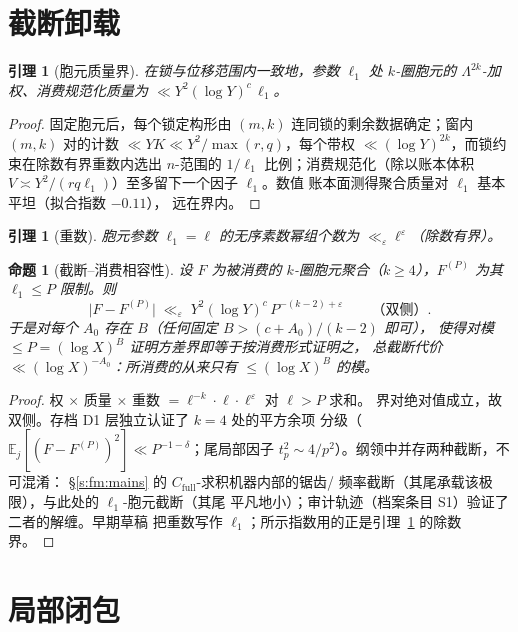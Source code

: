 \documentclass[11pt]{article}
\numberwithin{equation}{section}
\newtheorem{lemma}[theorem]{引理}
\newtheorem{proposition}[theorem]{命题}
\theoremstyle{definition}
\theoremstyle{remark}
\newcommand{\LL}{\Lambda}
\begin{document}
\section{截断卸载}\label{s:trunc}

\begin{lemma}[胞元质量界]\label{l:mass}
在锁与位移范围内一致地，参数 $\ell_1$ 处 $k$-圈胞元的
$\LL^{2k}$-加权、消费规范化质量为
$\ll Y^{2}(\log Y)^{c}\,\ell_1$。
\end{lemma}

\begin{proof}
固定胞元后，每个锁定构形由 $(m,k)$ 连同锁的剩余数据确定；窗内
$(m,k)$ 对的计数 $\ll YK\ll Y^{2}/\max(r,q)$，每个带权
$\ll(\log Y)^{2k}$，而锁约束在除数有界重数内选出 $n$-范围的
$1/\ell_1$ 比例；消费规范化（除以账本体积
$V\asymp Y^{2}/(rq\ell_1)$）至多留下一个因子 $\ell_1$。数值
账本面测得聚合质量对 $\ell_1$ 基本平坦（拟合指数 $-0.11$），
远在界内。
\end{proof}

\begin{lemma}[重数]\label{l:mult}
胞元参数 $\ell_1=\ell$ 的无序素数幂组个数为
$\ll_{\varepsilon}\ell^{\varepsilon}$（除数有界）。
\end{lemma}

\begin{proposition}[截断--消费相容性]\label{p:consume}
设 $F$ 为被消费的 $k$-圈胞元聚合（$k\ge4$），$F^{(P)}$ 为其
$\ell_1\le P$ 限制。则
\[
\bigl|F-F^{(P)}\bigr|\;\ll_{\varepsilon}\;
Y^{2}(\log Y)^{c}\,P^{-(k-2)+\varepsilon}
\qquad\text{（双侧）}.
\]
于是对每个 $A_0$ 存在 $B$（任何固定 $B>(c+A_0)/(k-2)$ 即可），
使得对模 $\le P=(\log X)^{B}$ 证明方差界即等于按消费形式证明之，
总截断代价 $\ll(\log X)^{-A_0}$：所消费的从来只有
$\le(\log X)^{B}$ 的模。
\end{proposition}

\begin{proof}
权 $\times$ 质量 $\times$ 重数
$=\ell^{-k}\cdot\ell\cdot\ell^{\varepsilon}$ 对 $\ell>P$ 求和。
界对绝对值成立，故双侧。存档 D1 层独立认证了 $k=4$ 处的平方余项
分级（$\mathbb E_j[(F-F^{(P)})^2]\ll P^{-1-\delta}$；尾局部因子
$t_p^{2}\sim4/p^{2}$）。纲领中并存两种截断，不可混淆：
\S\ref{s:fm:mains} 的 $C_{\mathrm{full}}$-求积机器内部的锯齿/
频率截断（其尾承载该极限），与此处的 $\ell_1$-胞元截断（其尾
平凡地小）；审计轨迹（档案条目 S1）验证了二者的解缠。早期草稿
把重数写作 $\ell_1$；所示指数用的正是引理~\ref{l:mult} 的除数
界。
\end{proof}

\section{局部闭包}\label{s:local}
\end{document}
